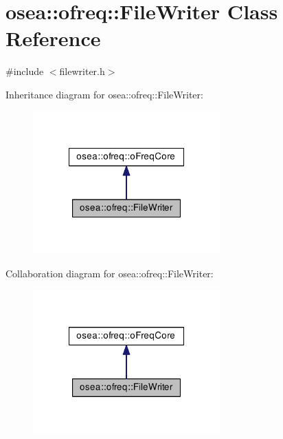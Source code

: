 \hypertarget{classosea_1_1ofreq_1_1_file_writer}{\section{osea\-:\-:ofreq\-:\-:File\-Writer Class Reference}
\label{classosea_1_1ofreq_1_1_file_writer}
}


{\ttfamily \#include $<$filewriter.\-h$>$}



Inheritance diagram for osea\-:\-:ofreq\-:\-:File\-Writer\-:
\nopagebreak
\begin{figure}[H]
\begin{center}
\leavevmode
\includegraphics[width=204pt]{classosea_1_1ofreq_1_1_file_writer__inherit__graph}
\end{center}
\end{figure}


Collaboration diagram for osea\-:\-:ofreq\-:\-:File\-Writer\-:
\nopagebreak
\begin{figure}[H]
\begin{center}
\leavevmode
\includegraphics[width=204pt]{classosea_1_1ofreq_1_1_file_writer__coll__graph}
\end{center}
\end{figure}
